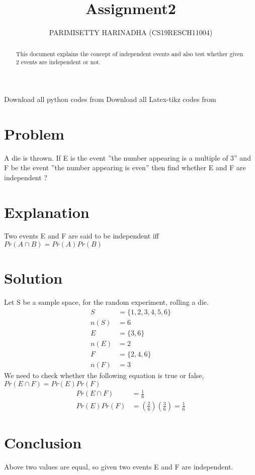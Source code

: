 \documentclass[journal,12pt,twocolumn]{IEEEtran}
\title{ Assignment2}
\author{PARIMISETTY HARINADHA (CS19RESCH11004)}
\begin{document}
\maketitle
\newpage
\begin{abstract}
This document explains the concept of independent events and also test whether given 2 events are independent or not.
\end{abstract}
Download all python codes from 
Download all Latex-tikz codes from 
\section{Problem}
A die is thrown. If E is the event ”the number appearing is a multiple of 3” and F be the event ”the number appearing is even” then find whether E and F are independent ?

\section{Explanation}
    Two events E and F are said to be independent iff ${Pr(A \cap B)}={Pr(A)}{Pr(B)}$

\section{Solution}
Let S be a sample space, for the random experiment, rolling a die.
\begin{align}
        S &= \{1, 2, 3, 4, 5, 6\} \\ 
        n(S) &= 6 \\
	E &= \{3, 6\} \\ 
	n(E) &= 2 \\
	F &= \{2, 4, 6\} \\
	n(F) &= 3 
\end{align}
We need to check whether the following equation is true or false,
${Pr(E \cap F)} = {Pr(E)}{Pr(F)}$
\begin{align}
        {Pr(E \cap F)} &= \frac{1}{6} \\
        {Pr(E)}{Pr(F)} &= (\frac{2}{6}) (\frac{3}{6}) = \frac{1}{6}
    \end{align}
\section{Conclusion}
Above two values are equal, so given two events E and F are independent.
\end{document}
